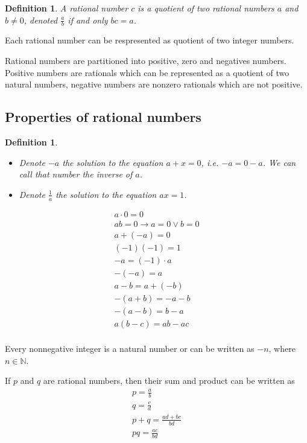 \documentclass[letterpaper, 10pt]{article}
\newtheorem{define}[thm]{Definition}
\begin{document}
	\begin{define}
		A rational number $c$ is a quotient of two rational numbers $a$ and $b
		\neq 0$, denoted $\frac{a}{b}$ if and only $bc = a$.
	\end{define}

	Each rational number can be respresented as quotient of two integer numbers.
	
	Rational numbers are partitioned into positive, zero and negatives numbers.
	Positive numbers are rationals which can be represented as a quotient of two
	natural numbers, negative numbers are nonzero rationals which are not
	positive.
	\subsection{Properties of rational numbers}
	
	\begin{define}
		\begin{itemize}
			\item Denote $-a$ the solution to the equation $a + x = 0$, i.e. $-a = 0
		- a$. We can call that number the inverse of $a$.
			\item Denote $\frac{1}{a}$ the solution to the equation $ax = 1$.
		\end{itemize}
	\end{define}

	\begin{gather*}
		a \cdot 0 = 0\\
		ab=0 \rightarrow a=0 \lor b =0 \\
		a + (-a) = 0 \\
		(-1)(-1) = 1 \\
		-a = (-1)\cdot a\\
		-(-a) = a \\
		a - b = a + (-b) \\
		-(a+b) = -a - b\\
		-(a-b) = b - a\\
		a(b-c) = ab - ac\\
	\end{gather*}

	Every nonnegative integer is a natural number or can be written as $-n$,
	where $n \in \mathbb{N}$.

	If $p$ and $q$ are rational numbers, then their sum and product can be
	written as 
	\begin{gather*}
		p = \frac{a}{b} \\
		q = \frac{c}{d} \\
		p + q = \frac{ad+bc}{bd}\\
		pq = \frac{ac}{bd}
	\end{gather*}
\end{document}
